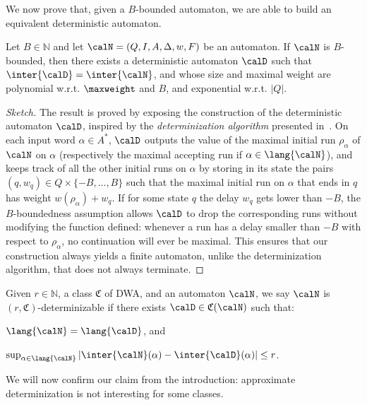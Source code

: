 \documentclass[a4paper]{article}
\begin{document}
We now prove that, given a $B$-bounded automaton, we are able to build an
equivalent deterministic automaton.

\begin{proposition}\label{pro:bound-to-det}
	Let $B \in \mathbb{N}$ and let $\calN = (Q,I,A,\Delta,w,F)$ be an automaton.
	If $\calN$ is $B$-bounded, then there exists a
	deterministic automaton $\calD$ such that $\inter{\calD} =
	\inter{\calN}$, and whose size and maximal weight are
	polynomial w.r.t. $\maxweight$ and $B$, and exponential w.r.t. $|Q|$.
\end{proposition}

\begin{proof}[Sketch]
	The result is proved by exposing the construction of the deterministic
	automaton $\calD$, inspired by the \emph{determinization algorithm}
	presented in~\cite{Mohri_FiniteState_CoLing}.  On each input word
	$\alpha \in A^*$, $\calD$ outputs the value of the maximal initial run
	$\rho_\alpha$ of $\calN$ on $\alpha$ (respectively the maximal
	accepting run if $\alpha \in \lang{\calN}$), and keeps track of all the
	other initial runs on $\alpha$ by storing in its state the pairs
	$(q,w_q) \in Q \times \{-B, \ldots, B\}$ such that the maximal initial
	run on $\alpha$ that ends in $q$ has weight $w(\rho_{\alpha}) + w_q$.
	If for some state $q$ the delay $w_q$ gets lower than $-B$, the
	$B$-boundedness assumption allows $\calD$ to drop the corresponding runs
	without modifying the function defined: whenever a run has a delay
	smaller than $-B$ with respect to $\rho_\alpha$, no continuation will
	ever be maximal. This ensures that our construction always yields a
	finite automaton, unlike the determinization algorithm, that does not
	always terminate.	
\end{proof}

Given $r \in \mathbb{N}$, a class $\mathfrak{C}$ of DWA, and an automaton
$\calN$, we say $\calN$ is $(r,\mathfrak{C})$-determinizable if there exists
$\calD \in \mathfrak{C}(\calN)$ such that:
\begin{inparaenum}[$(i)$]
	\item $\lang{\calN} = \lang{\calD}$, and
	\item $\sup_{\alpha \in \lang{\calN}}
		\left|\inter{\calN}(\alpha) -
		\inter{\calD}(\alpha)\right| \le r$.
\end{inparaenum}

We will now confirm our claim from the introduction: approximate determinization
is not interesting for some classes.
\end{document}
